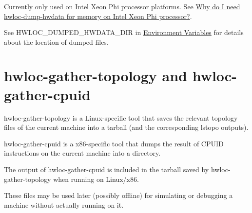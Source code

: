Currently only used on Intel Xeon Phi processor platforms. See \hyperlink{a00394_faq_knl_dump}{Why do I need hwloc-\/dump-\/hwdata for memory on Intel Xeon Phi processor?}.

See {\ttfamily H\+W\+L\+O\+C\+\_\+\+D\+U\+M\+P\+E\+D\+\_\+\+H\+W\+D\+A\+T\+A\+\_\+\+D\+IR} in \hyperlink{a00382}{Environment Variables} for details about the location of dumped files.

 \hypertarget{a00381_cli_hwloc_gather}{}\section{hwloc-\/gather-\/topology and hwloc-\/gather-\/cpuid}\label{a00381_cli_hwloc_gather}
hwloc-\/gather-\/topology is a Linux-\/specific tool that saves the relevant topology files of the current machine into a tarball (and the corresponding lstopo outputs).

hwloc-\/gather-\/cpuid is a x86-\/specific tool that dumps the result of C\+P\+U\+ID instructions on the current machine into a directory.

The output of hwloc-\/gather-\/cpuid is included in the tarball saved by hwloc-\/gather-\/topology when running on Linux/x86.

These files may be used later (possibly offline) for simulating or debugging a machine without actually running on it. 